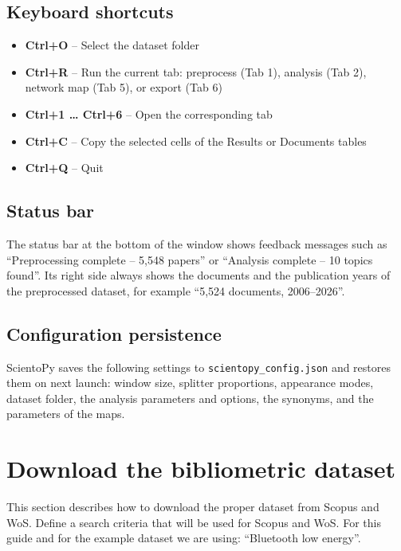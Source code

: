 \documentclass[10pt,letterpaper]{article}
\begin{document}
\subsection{Keyboard shortcuts}
\begin{itemize}
\item \textbf{Ctrl+O} -- Select the dataset folder
\item \textbf{Ctrl+R} -- Run the current tab: preprocess (Tab 1), analysis (Tab 2), network map (Tab 5), or export (Tab 6)
\item \textbf{Ctrl+1 \ldots{} Ctrl+6} -- Open the corresponding tab
\item \textbf{Ctrl+C} -- Copy the selected cells of the Results or Documents tables
\item \textbf{Ctrl+Q} -- Quit
\end{itemize}

\subsection{Status bar}
The status bar at the bottom of the window shows feedback messages such as ``Preprocessing complete -- 5,548 papers'' or ``Analysis complete -- 10 topics found''. Its right side always shows the documents and the publication years of the preprocessed dataset, for example ``5,524 documents, 2006--2026''.

\subsection{Configuration persistence}
ScientoPy saves the following settings to \verb|scientopy_config.json| and restores them on next launch: window size, splitter proportions, appearance modes, dataset folder, the analysis parameters and options, the synonyms, and the parameters of the maps.


\section{Download the bibliometric dataset}
This section describes how to download the proper dataset from Scopus and WoS. Define a search criteria that will be used for Scopus and WoS. For this guide and for the example dataset we are using: ``Bluetooth low energy''.
\end{document}
